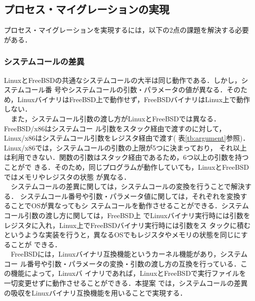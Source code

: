 \documentclass[10pt]{jarticle}
\begin{document}
\subsection{プロセス・マイグレーションの実現}
\label{sec:PM}
プロセス・マイグレーションを実現するには，以下の2点の課題を解決する必要がある．
\subsubsection{システムコールの差異}
  LinuxとFreeBSDの共通なシステムコールの大半は同じ動作である．しかし，システムコール番
  号やシステムコールの引数・パラメータの値が異なる．そのため，LinuxバイナリはFreeBSD上で動作せず，FreeBSDバイナリはLinux上で動作しない．\\
  　また，システムコール引数の渡し方がLinuxとFreeBSDでは異なる．FreeBSD/x86はシステムコー
  ル引数をスタック経由で渡すのに対して，Linux/x86はシステムコール引数をレジスタ経由で渡す(
  表\ref{tb:argument}参照)\cite{hello}．Linux/x86では，システムコールの引数の上限が5つに決まっており，
  それ以上は利用できない．関数の引数はスタック経由であるため，6つ以上の引数を持つことがで
  きる．そのため，同じプログラムが動作していても，LinuxとFreeBSDではメモリやレジスタの状態
  が異なる．\\
  　システムコールの差異に関しては，システムコールの変換を行うことで解決する．
システムコール番号や引数・パラメータ値に関しては，それぞれを変換することでOSが異なってもシ
ステムコールを動作させることができる．システムコール引数の渡し方に関しては，FreeBSD上
でLinuxバイナリ実行時には引数をレジスタに入れ，Linux上でFreeBSDバイナリ実行時には引数をス
タックに積むというような実装を行うと，異なるOSでもレジスタやメモリの状態を同じにすることが
できる．\\
　FreeBSDには，Linuxバイナリ互換機能\cite{linux-emu}というカーネル機能があり，システムコー
ル番号や引数・パラメータの変換・引数の渡し方の互換を行っている．この機能によって，Linuxバ
イナリであれば，LinuxとFreeBSDで実行ファイルを一切変更せずに動作させることができる．本提案
では，システムコールの差異の吸収をLinuxバイナリ互換機能を用いることで実現する．
\end{document}
